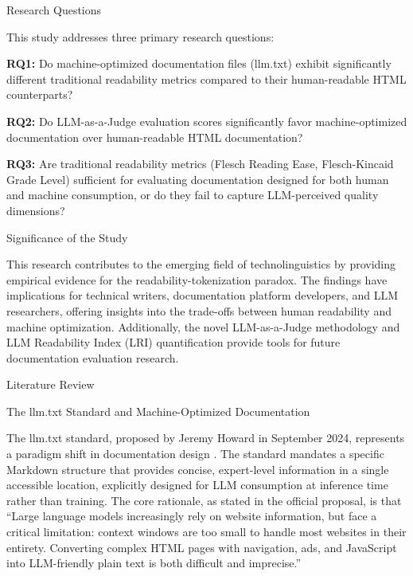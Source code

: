 \documentclass[10pt,conference,a4paper]{IEEEtran}
\makeatletter
\let\oldsection\section
\let\oldsubsection\subsection
\renewcommand{\section}{%
    \@ifstar{\sectionStar}{\sectionNoStar}%
}
\newcommand{\sectionStar}[1]{%
    \oldsection*{#1}%
    \vspace{-4pt}%
}
\newcommand{\sectionNoStar}[1]{%
    \oldsection{#1}%
    \vspace{-4pt}%
}
\renewcommand{\subsection}{%
    \@ifstar{\subsectionStar}{\subsectionNoStar}%
}
\newcommand{\subsectionStar}[1]{%
    \oldsubsection*{\textit{#1}}%
    \vspace{-3pt}%
}
\newcommand{\subsectionNoStar}[1]{%
    \oldsubsection{\textit{#1}}%
    \vspace{-3pt}%
}
\makeatother
\begin{document}
\subsection{Research Questions}

This study addresses three primary research questions:

\textbf{RQ1:} Do machine-optimized documentation files (llm.txt) exhibit significantly different traditional readability metrics compared to their human-readable HTML counterparts?

\textbf{RQ2:} Do LLM-as-a-Judge evaluation scores significantly favor machine-optimized documentation over human-readable HTML documentation?

\textbf{RQ3:} Are traditional readability metrics (Flesch Reading Ease, Flesch-Kincaid Grade Level) sufficient for evaluating documentation designed for both human and machine consumption, or do they fail to capture LLM-perceived quality dimensions?

\subsection{Significance of the Study}

This research contributes to the emerging field of technolinguistics by providing empirical evidence for the readability-tokenization paradox. The findings have implications for technical writers, documentation platform developers, and LLM researchers, offering insights into the trade-offs between human readability and machine optimization. Additionally, the novel LLM-as-a-Judge methodology and LLM Readability Index (LRI) quantification provide tools for future documentation evaluation research.

\section{Literature Review}

\subsection{The llm.txt Standard and Machine-Optimized Documentation}

The llm.txt standard, proposed by Jeremy Howard in September 2024, represents a paradigm shift in documentation design \cite{Howard2024}. The standard mandates a specific Markdown structure that provides concise, expert-level information in a single accessible location, explicitly designed for LLM consumption at inference time rather than training. The core rationale, as stated in the official proposal, is that ``Large language models increasingly rely on website information, but face a critical limitation: context windows are too small to handle most websites in their entirety. Converting complex HTML pages with navigation, ads, and JavaScript into LLM-friendly plain text is both difficult and imprecise.''
\end{document}
